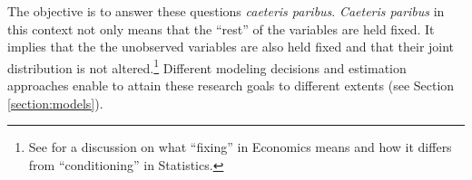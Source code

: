 \indent The objective is to answer these questions \emph{caeteris paribus}. \emph{Caeteris paribus} in this context not only means that the ``rest'' of the variables are held fixed. It implies that the the unobserved variables are also held fixed and that their joint distribution is not altered.\footnote{See \citet{heckman2013causal} for a discussion on what ``fixing'' in Economics means and how it differs from ``conditioning'' in Statistics.} Different modeling decisions and estimation approaches enable to attain these research goals to different extents (see Section \ref{section:models}).

 


 






